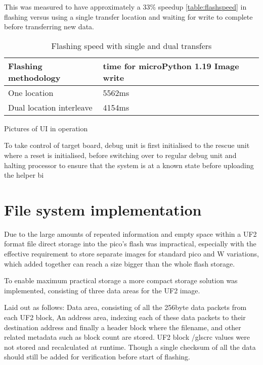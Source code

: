 This was measured to have approximately a 33\% speedup \autoref{table:flashspeed} in flashing versus using a single transfer location and waiting for write to complete before transferring new data.

\begin{table}[h]
	\centering
	\caption{Flashing speed with single and dual transfers}%
	\vspace{-16.5pt}%
	
	\begin{tabular}{|l|l|}
		\hline
		Flashing methodology & time for microPython 1.19 Image write    \\ \hline
		One location & 5562ms \\ \hline
		Dual location interleave & 4154ms \\ \hline
	\end{tabular}
	\label{table:flashspeed}
\end{table}

Pictures of UI in operation

To take control of target board, debug unit is first initialised to the rescue unit where a reset is initialised, before switching over to regular debug unit and halting processor to ensure that the system is at a known state before uploading the helper bi


\clearpage
\section{File system implementation}

Due to the large amounts of repeated information and empty space within a UF2 format file direct storage into the pico's flash was impractical, especially with the effective requirement to store separate images for standard pico and W variations, which added together can reach a size bigger than the whole flash storage.

To enable maximum practical storage a more compact storage solution was implemented, consisting of three data areas for the UF2 image.

Laid out as follows: Data area, consisting of all the 256byte data packets from each UF2 block, An address area, indexing each of these data packets to their destination address and finally a header block where the filename, and other related metadata such as block count are stored. UF2 block /gls{crc} values were not stored and recalculated at runtime. Though a single checksum of all the data should still be added for verification before start of flashing.

